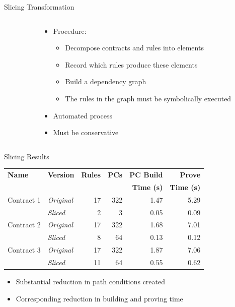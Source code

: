 \documentclass[12pt, handout]{beamer}
\begin{document}
\begin{frame}{Slicing Transformation}
\begin{columns}[T]
\begin{column}[T]{0.45\textwidth}
 \end{column}
     \begin{column}[T]{0.55\textwidth}
     \begin{itemize}[<+->]
\item Procedure:
\begin{itemize}[<+->]
\item Decompose contracts and rules into elements
\item Record which rules produce these elements
\item Build a dependency graph
\item The rules in the graph must be symbolically executed
\end{itemize}
\item Automated process
\item Must be conservative
\end{itemize}
 \end{column}
 \end{columns}
\end{frame}

\begin{frame}{Slicing Results}

\begin{center}

\begin{tabular}{l l | r| r | r | r }
\textbf{Name} & \textbf{Version} & \textbf{Rules} & \textbf{PCs} & \textbf{PC Build}   & \textbf{Prove}\\
& & & &\textbf{Time (s)}&\textbf{Time (s)}\\\hline\hline
Contract 1& \textit{Original} & 17 & 322 & 1.47 & 5.29 \\
& \textit{Sliced}& 2 & 3 & 0.05 & 0.09 \\\hline

Contract 2& \textit{Original} & 17 & 322 & 1.68 & 7.01 \\
& \textit{Sliced}& 8 & 64 & 0.13 & 0.12 \\\hline

Contract 3 & \textit{Original} & 17 & 322 & 1.87 & 7.06\\
& \textit{Sliced}& 11 & 64 & 0.55 & 0.62 \\\hline
\end{tabular}
\end{center}

\begin{itemize}
\item Substantial reduction in path conditions created
\item Corresponding reduction in building and proving time
\end{itemize}
\end{frame}
\end{document}

